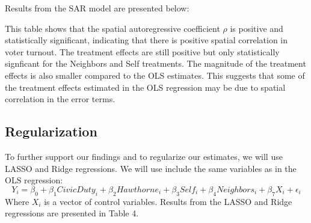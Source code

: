 \documentclass[11pt, draft]{article}
\begin{document}
Results from the SAR model are presented below:

\begin{centering}
    
\end{centering}

This table shows that the spatial autoregressive coefficient $\rho$ is positive and statistically significant, indicating that there is positive spatial correlation in voter turnout. The treatment effects are still positive but only statistically signficant for the Neighbors and Self treatments. The magnitude of the treatment effects is also smaller compared to the OLS estimates. This suggests that some of the treatment effects estimated in the OLS regression may be due to spatial correlation in the error terms.

\subsection{Regularization}
To further support our findings and to regularize our estimates, we will use LASSO and Ridge regressions. We will use include the same variables as in the OLS regression:
\begin{equation}
    Y_i = \beta_0 + \beta_1 CivicDuty_i + \beta_2 Hawthorne_i + \beta_3 Self_i + \beta_4 Neighbors_i + \beta_7 X_i + \epsilon_i
\end{equation}
Where $X_i$ is a vector of control variables. Results from the LASSO and Ridge regressions are presented in Table 4.
\end{document}
